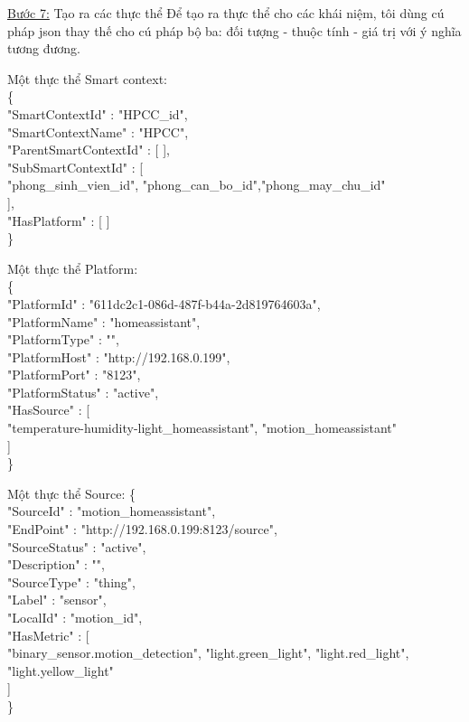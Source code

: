 \underline{Bước 7:} Tạo ra các thực thể
Để tạo ra thực thể cho các khái niệm, tôi dùng cú pháp json thay thế cho cú pháp bộ ba: đối tượng - thuộc tính - giá trị với ý nghĩa tương đương.

\hspace{0mm}Một thực thể Smart context: \\
\{\\
\blank{1cm}"SmartContextId" : "HPCC\_id", \\
\blank{1cm}"SmartContextName" : "HPCC",	\\
\blank{1cm}"ParentSmartContextId" : [ ],	\\
\blank{1cm}"SubSmartContextId" : [\\
\blank{2cm}"phong\_sinh\_vien\_id", "phong\_can\_bo\_id","phong\_may\_chu\_id"\\
\blank{1cm}], \\
\blank{1cm}"HasPlatform" : [ ]\\
\}
\clearpage

\hspace{0mm}Một thực thể Platform: \\
\{\\
\blank{1cm}"PlatformId" : "611dc2c1-086d-487f-b44a-2d819764603a", \\
\blank{1cm}"PlatformName" : "homeassistant",	\\
\blank{1cm}"PlatformType" : "",	\\
\blank{1cm}"PlatformHost" : "http://192.168.0.199",\\
\blank{1cm}"PlatformPort" : "8123",\\
\blank{1cm}"PlatformStatus" : "active",\\
\blank{1cm}"HasSource" : [\\
\blank{2cm}"temperature-humidity-light\_homeassistant", "motion\_homeassistant"\\
\blank{1cm}]\\
\}

\hspace{0mm}Một thực thể Source:
\{\\
\blank{1cm}"SourceId" : "motion\_homeassistant",\\
\blank{1cm}"EndPoint" : "http://192.168.0.199:8123/source",\\
\blank{1cm}"SourceStatus" : "active",\\
\blank{1cm}"Description" : "",\\
\blank{1cm}"SourceType" : "thing",\\
\blank{1cm}"Label" : "sensor",\\
\blank{1cm}"LocalId" : "motion\_id",\\
\blank{1cm}"HasMetric" : [\\
\blank{2cm}"binary\_sensor.motion\_detection", "light.green\_light", "light.red\_light", "light.yellow\_light"\\
\blank{1cm}] \\
\}

